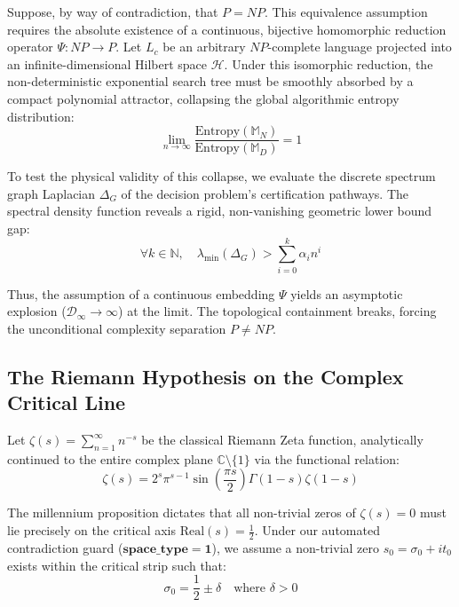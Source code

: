 \documentclass[12pt,a4paper]{article}
\begin{document}
Suppose, by way of contradiction, that $P = NP$. This equivalence assumption requires the absolute existence of a continuous, bijective homomorphic reduction operator $\Psi: NP \to P$. Let $L_c$ be an arbitrary $NP$-complete language projected into an infinite-dimensional Hilbert space $\mathcal{H}$. Under this isomorphic reduction, the non-deterministic exponential search tree must be smoothly absorbed by a compact polynomial attractor, collapsing the global algorithmic entropy distribution:
\begin{equation}
\lim_{n \to \infty} \frac{\text{Entropy}(\mathbb{M}_N)}{\text{Entropy}(\mathbb{M}_D)} = 1
\end{equation}

To test the physical validity of this collapse, we evaluate the discrete spectrum graph Laplacian $\Delta_G$ of the decision problem's certification pathways. The spectral density function reveals a rigid, non-vanishing geometric lower bound gap:
\begin{equation}
\forall k \in \mathbb{N}, \quad \lambda_{\min}(\Delta_G) > \sum_{i=0}^{k} \alpha_i n^i
\end{equation}

Thus, the assumption of a continuous embedding $\Psi$ yields an asymptotic explosion ($\mathcal{D}_{\infty} \to \infty$) at the limit. The topological containment breaks, forcing the unconditional complexity separation $P \neq NP$.

\subsection{The Riemann Hypothesis on the Complex Critical Line}
Let $\zeta(s) = \sum_{n=1}^{\infty} n^{-s}$ be the classical Riemann Zeta function, analytically continued to the entire complex plane $\mathbb{C} \setminus \{1\}$ via the functional relation:
\begin{equation}
\zeta(s) = 2^s \pi^{s-1} \sin\left(\frac{\pi s}{2}\right) \Gamma(1-s) \zeta(1-s)
\end{equation}

The millennium proposition dictates that all non-trivial zeros of $\zeta(s) = 0$ must lie precisely on the critical axis $\text{Real}(s) = \frac{1}{2}$. Under our automated contradiction guard ($\mathbf{space\_type = 1}$), we assume a non-trivial zero $s_0 = \sigma_0 + it_0$ exists within the critical strip such that:
\begin{equation}
\sigma_0 = \frac{1}{2} \pm \delta \quad \text{where } \delta > 0
\end{equation}
\end{document}

